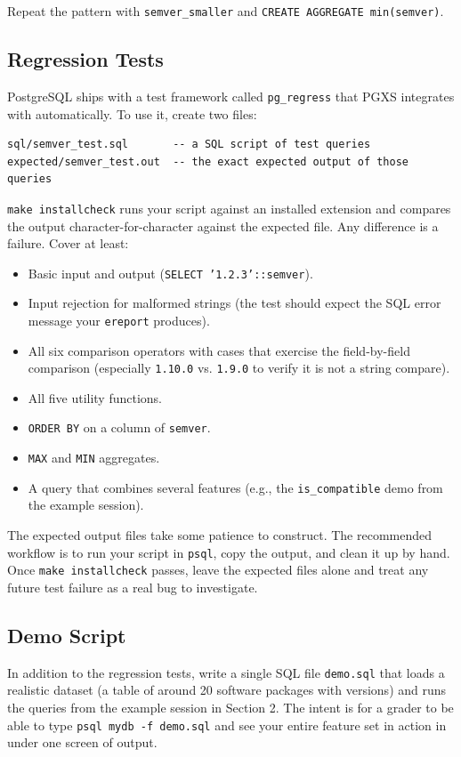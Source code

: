 \documentclass[11pt,a4paper]{article}
\begin{document}
Repeat the pattern with \texttt{semver\_smaller} and \texttt{CREATE AGGREGATE min(semver)}.

\subsection{Regression Tests}
PostgreSQL ships with a test framework called \texttt{pg\_regress} that PGXS integrates with automatically. To use it, create two files:

\begin{codebox}
\begin{lstlisting}
sql/semver_test.sql       -- a SQL script of test queries
expected/semver_test.out  -- the exact expected output of those queries
\end{lstlisting}
\end{codebox}

\texttt{make installcheck} runs your script against an installed extension and compares the output character-for-character against the expected file. Any difference is a failure. Cover at least:

\begin{itemize}
\item Basic input and output (\texttt{SELECT '1.2.3'::semver}).
\item Input rejection for malformed strings (the test should expect the SQL error message your \texttt{ereport} produces).
\item All six comparison operators with cases that exercise the field-by-field comparison (especially \texttt{1.10.0} vs. \texttt{1.9.0} to verify it is not a string compare).
\item All five utility functions.
\item \texttt{ORDER BY} on a column of \texttt{semver}.
\item \texttt{MAX} and \texttt{MIN} aggregates.
\item A query that combines several features (e.g., the \texttt{is\_compatible} demo from the example session).
\end{itemize}

The expected output files take some patience to construct. The recommended workflow is to run your script in \texttt{psql}, copy the output, and clean it up by hand. Once \texttt{make installcheck} passes, leave the expected files alone and treat any future test failure as a real bug to investigate.

\subsection{Demo Script}
In addition to the regression tests, write a single SQL file \texttt{demo.sql} that loads a realistic dataset (a table of around 20 software packages with versions) and runs the queries from the example session in Section 2. The intent is for a grader to be able to type \texttt{psql mydb -f demo.sql} and see your entire feature set in action in under one screen of output.
\end{document}
